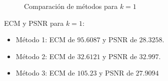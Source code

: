 \begin{figure}[H]
    \centering
    \qquad
    \qquad
    \caption{Comparación de métodos para $k = 1$}%
    \label{fig:example}%
\end{figure}

ECM y PSNR para $k = 1$:

\begin{itemize}
 \item Método 1: ECM de $95.6087$ y PSNR de $28.3258$.
 \item Método 2: ECM de $32.6121$ y PSNR de $32.997$.
 \item Método 3: ECM de $105.23$ y PSNR de $27.9094$
\end{itemize}

